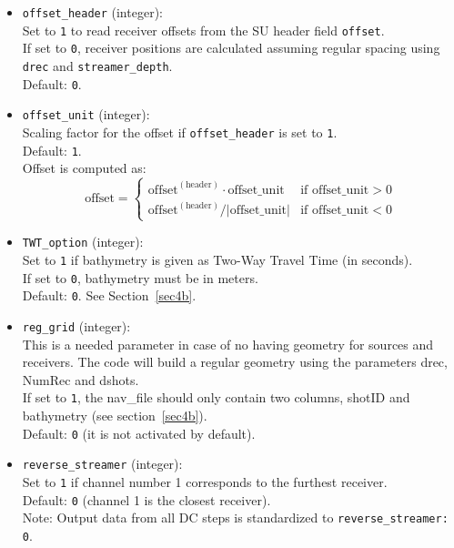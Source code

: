 \documentclass[11pt, oneside]{article}   	%
\begin{document}
\begin{itemize}
\item \texttt{offset\_header} (integer):\\
Set to \texttt{1} to read receiver offsets from the SU header field \texttt{offset}.\\
If set to \texttt{0}, receiver positions are calculated assuming regular spacing using \texttt{drec} and \texttt{streamer\_depth}.\\
Default: \texttt{0}.

\item \texttt{offset\_unit} (integer):\\
Scaling factor for the offset if \texttt{offset\_header} is set to \texttt{1}.\\
Default: \texttt{1}.\\
Offset is computed as:
\[
\text{offset} =
\begin{cases}
\text{offset}^{(\text{header})} \cdot \text{offset\_unit} & \text{if } \text{offset\_unit} > 0 \\
\text{offset}^{(\text{header})} / |\text{offset\_unit}| & \text{if } \text{offset\_unit} < 0
\end{cases}
\]

\item \texttt{TWT\_option} (integer):\\
Set to \texttt{1} if bathymetry is given as Two-Way Travel Time (in seconds).\\
If set to \texttt{0}, bathymetry must be in meters.\\
Default: \texttt{0}. See Section~\ref{sec4b}.

\item \texttt{reg\_grid} (integer):\\
This is a needed parameter in case of no having geometry for sources and receivers. The code will build a regular geometry using the parameters drec, NumRec and dshots. \\
If set to \texttt{1}, the nav\_file should only contain two columns, shotID and bathymetry (see section~\ref{sec4b}).\\
Default: \texttt{0} (it is not activated by default).

\item \texttt{reverse\_streamer} (integer):\\
Set to \texttt{1} if channel number 1 corresponds to the furthest receiver.\\
Default: \texttt{0} (channel 1 is the closest receiver).\\
Note: Output data from all DC steps is standardized to \texttt{reverse\_streamer: 0}.


\end{itemize}
\end{document}
